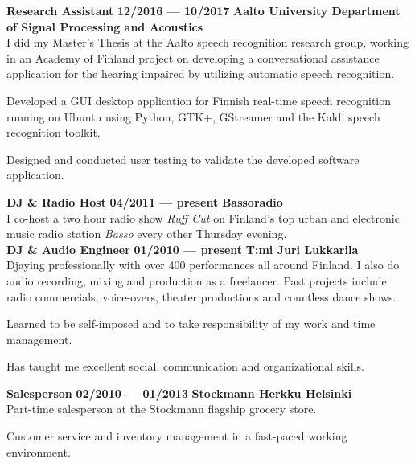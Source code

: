\documentclass[8pt,a4paper,oneside]{article}
\newcommand{\myrule}{\vspace{0.5mm} {\color{lightgray}{\hrule height 0.5pt width \textwidth depth 0pt}} \vspace{1mm}}
\newcommand{\titledate}[2]{{\bfseries \color{textcolor}  \fontsize{11.5}{11.5}\selectfont #1} \hfill \textbf{#2} \myrule}
\newcommand{\workplace}[1]{{\bfseries \fontsize{10.5}{10.5}\selectfont #1}}
\newcommand{\sectitle}[1]{{\sc \bfseries \LARGE #1}}
\newcommand{\boxarc}{2.5mm}
\newcommand{\boxtop}{1.5mm}
\begin{document}
\begin{minipage}[t]{0.638\textwidth}
\begin{tcolorbox}[top=1mm,bottom=1mm,right=1mm,left=1mm,arc=\boxarc,toptitle=\boxtop,bottomtitle=1mm,title=\sectitle{Experience},box align=bottom]
		\titledate{Research Assistant}{12/2016 --- 10/2017}
		\workplace{Aalto University Department of Signal Processing and Acoustics} \\
		I did my Master’s Thesis at the Aalto speech recognition research group, working in an Academy of Finland project on developing a conversational assistance application for the hearing impaired by utilizing automatic speech recognition.
		\begin{cvlist}
			\item Developed a GUI desktop application for Finnish real-time speech recognition running on Ubuntu using Python, GTK+, GStreamer and the Kaldi speech recognition toolkit.
			\item Designed and conducted user testing to validate the developed software application. \\
		\end{cvlist}
		
		\titledate{DJ \& Radio Host}{04/2011 --- present}
		\workplace{Bassoradio} \\
		I co-host a two hour radio show \textit{Ruff Cut} on Finland’s top urban and electronic music radio station \textit{Basso} every other Thursday evening. \\
		
		\titledate{DJ \& Audio Engineer}{01/2010 --- present}
		\workplace{T:mi Juri Lukkarila} \\
		Djaying professionally with over 400 performances all around Finland. I also do audio recording, mixing and production as a freelancer. Past projects include radio commercials, voice-overs, theater productions and countless dance shows.
		\begin{cvlist}
			\item Learned to be self-imposed and to take responsibility of my work and time management.
			\item Has taught me excellent social, communication and organizational skills. \\
		\end{cvlist}
		
		\titledate{Salesperson }{02/2010 --- 01/2013}
		\workplace{Stockmann Herkku Helsinki} \\
		Part-time salesperson at the Stockmann flagship grocery store.
		\begin{cvlist}
			\item Customer service and inventory management in a fast-paced working environment.
		\end{cvlist}
	\end{tcolorbox}
	
\end{minipage}%
\end{document}
